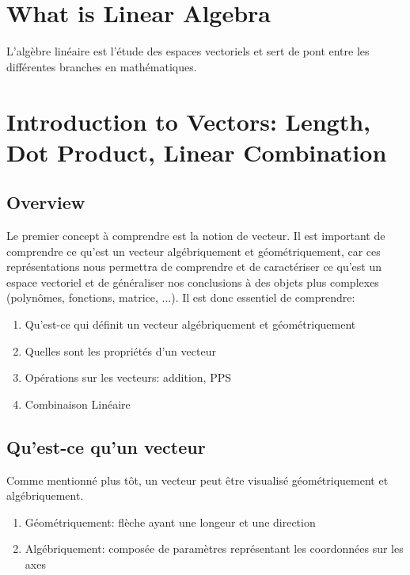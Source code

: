\documentclass{article}
\begin{document}
\newtheorem{definition}{Definition}[subsection]
\newtheorem{theorem}{Theorem}[subsection]
\newtheorem{corollary}{Corollary}[subsection]
\newtheorem{lemma}[theorem]{Lemma}
\newtheorem{proposition}{Proposition}[section]
\newtheorem{axiom}{Axiome}
\newtheorem{property}{Propriété}[subsection]
\newtheorem*{remark}{Remarque}
\newtheorem*{proof}{Proof}[subsection]
\newtheorem*{problem}{Problème}
\newtheorem*{intuition}{Intuition}

\section{What is Linear Algebra}

L'algèbre linéaire est l'étude des espaces vectoriels et sert de pont entre les
différentes branches en mathématiques.

\section{Introduction to Vectors: Length, Dot Product, Linear Combination}

\subsection{Overview}

Le premier concept à comprendre est la notion de vecteur. Il est important
de comprendre ce qu'est un vecteur algébriquement et géométriquement, car ces
représentations nous permettra de comprendre et de caractériser ce qu'est
un espace vectoriel et de généraliser nos conclusions à des objets plus
complexes (polynômes, fonctions, matrice, ...). Il est donc essentiel de
comprendre:
\begin{enumerate}
    \item Qu'est-ce qui définit un vecteur algébriquement et géométriquement
    \item Quelles sont les propriétés d'un vecteur
    \item Opérations sur les vecteurs: addition, PPS
    \item Combinaison Linéaire
\end{enumerate}

\subsection{Qu'est-ce qu'un vecteur}%
\label{ssub:Qu'est-ce qu'un vecteur}

Comme mentionné plus tôt, un vecteur peut être visualisé géométriquement et
algébriquement.
\begin{enumerate}
    \item Géométriquement: flèche ayant une longeur et une direction
    \item Algébriquement: composée de paramètres représentant les coordonnées
	sur les axes
\end{enumerate}
\end{document}
